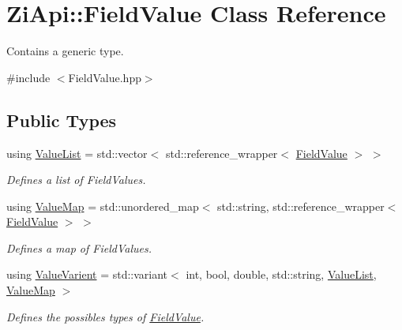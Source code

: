 \hypertarget{classZiApi_1_1FieldValue}{}\section{Zi\+Api\+::Field\+Value Class Reference}
\label{classZiApi_1_1FieldValue}


Contains a generic type.  




{\ttfamily \#include $<$Field\+Value.\+hpp$>$}

\subsection*{Public Types}
\begin{DoxyCompactItemize}
\item 
\mbox{\label{classZiApi_1_1FieldValue_a9ab71bf0ac13af93bbf9f4d7018f0909}} 
using \mbox{\hyperlink{classZiApi_1_1FieldValue_a9ab71bf0ac13af93bbf9f4d7018f0909}{Value\+List}} = std\+::vector$<$ std\+::reference\+\_\+wrapper$<$ \mbox{\hyperlink{classZiApi_1_1FieldValue}{Field\+Value}} $>$ $>$
\begin{DoxyCompactList}\small\item\em Defines a list of Field\+Values. \end{DoxyCompactList}\item 
\mbox{\label{classZiApi_1_1FieldValue_a95c5ffaae9c08c1a6129847205258d8a}} 
using \mbox{\hyperlink{classZiApi_1_1FieldValue_a95c5ffaae9c08c1a6129847205258d8a}{Value\+Map}} = std\+::unordered\+\_\+map$<$ std\+::string, std\+::reference\+\_\+wrapper$<$ \mbox{\hyperlink{classZiApi_1_1FieldValue}{Field\+Value}} $>$ $>$
\begin{DoxyCompactList}\small\item\em Defines a map of Field\+Values. \end{DoxyCompactList}\item 
\mbox{\label{classZiApi_1_1FieldValue_ad15b3d7fad80efab396843e70a5b1db2}} 
using \mbox{\hyperlink{classZiApi_1_1FieldValue_ad15b3d7fad80efab396843e70a5b1db2}{Value\+Varient}} = std\+::variant$<$ int, bool, double, std\+::string, \mbox{\hyperlink{classZiApi_1_1FieldValue_a9ab71bf0ac13af93bbf9f4d7018f0909}{Value\+List}}, \mbox{\hyperlink{classZiApi_1_1FieldValue_a95c5ffaae9c08c1a6129847205258d8a}{Value\+Map}} $>$
\begin{DoxyCompactList}\small\item\em Defines the possibles types of \mbox{\hyperlink{classZiApi_1_1FieldValue}{Field\+Value}}. \end{DoxyCompactList}\end{DoxyCompactItemize}

